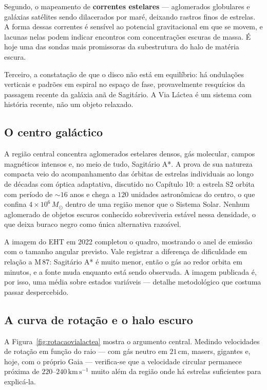 \documentclass[11pt,a4paper]{article}
\begin{document}
Segundo, o mapeamento de \textbf{correntes estelares} --- aglomerados globulares e galáxias satélites sendo dilacerados por maré, deixando rastros finos de estrelas. A forma dessas correntes é sensível ao potencial gravitacional em que se movem, e lacunas nelas podem indicar encontros com concentrações escuras de massa. É hoje uma das sondas mais promissoras da subestrutura do halo de matéria escura.

Terceiro, a constatação de que o disco não está em equilíbrio: há ondulações verticais e padrões em espiral no espaço de fase, provavelmente resquícios da passagem recente da galáxia anã de Sagitário. A Via Láctea é um sistema com história recente, não um objeto relaxado.

\subsection*{O centro galáctico}

A região central concentra aglomerados estelares densos, gás molecular, campos magnéticos intensos e, no meio de tudo, Sagitário A*. A prova de sua natureza compacta veio do acompanhamento das órbitas de estrelas individuais ao longo de décadas com óptica adaptativa, discutido no Capítulo 10: a estrela S2 orbita com período de $\sim16$ anos e chega a $120$ unidades astronômicas do centro, o que confina $4\times10^{6}\,M_\odot$ dentro de uma região menor que o Sistema Solar. Nenhum aglomerado de objetos escuros conhecido sobreviveria estável nessa densidade, o que deixa buraco negro como única alternativa razoável.

A imagem do EHT em 2022 completou o quadro, mostrando o anel de emissão com o tamanho angular previsto. Vale registrar a diferença de dificuldade em relação a M\,87: Sagitário A* é muito menor, então o gás ao redor orbita em minutos, e a fonte muda enquanto está sendo observada. A imagem publicada é, por isso, uma média sobre estados variáveis --- detalhe metodológico que costuma passar despercebido.

\subsection*{A curva de rotação e o halo escuro}

A Figura~\ref{fig:rotacaovialactea} mostra o argumento central. Medindo velocidades de rotação em função do raio --- com gás neutro em $21\,\mathrm{cm}$, masers, gigantes e, hoje, com o próprio Gaia --- verifica-se que a velocidade circular permanece próxima de $220$--$240\,\mathrm{km\,s^{-1}}$ muito além da região onde há estrelas suficientes para explicá-la.
\end{document}
